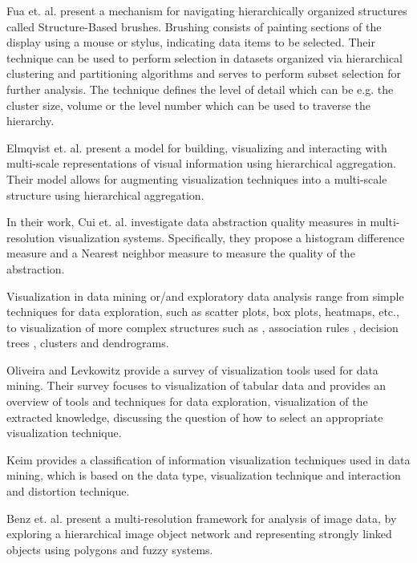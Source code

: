 Fua et. al. \cite{Fua:2000:SBM:614278.614457} present a mechanism for navigating hierarchically organized structures
called Structure-Based brushes. Brushing consists of painting sections of the display using a mouse or stylus, indicating
data items to be selected. Their technique can be used to perform selection in datasets organized via hierarchical
clustering and partitioning algorithms and serves to perform subset selection for further analysis. The technique defines
the level of detail which can be e.g. the cluster size, volume or the level number which can be used to traverse the
hierarchy.

Elmqvist et. al. \cite{Elmqvist:2010:HAI:1749404.1749525} present a model for building, visualizing and interacting with
multi-scale representations of visual information using hierarchical aggregation. Their model allows for augmenting visualization
techniques into a multi-scale structure using hierarchical aggregation.

In their work, Cui et. al. \cite{4015421} investigate data abstraction quality measures in multi-resolution
visualization systems. Specifically, they propose a histogram difference measure and a Nearest neighbor
measure to measure the quality of the abstraction.



Visualization in data mining or/and exploratory data analysis range from simple techniques for data exploration, such as
scatter plots, box plots, heatmaps, etc., to visualization of more complex structures such as ,
association rules \cite{Hahsler_visualizingassociation}, decision trees \cite{963292,Nguyen2000}, clusters and dendrograms.

Oliveira and Levkowitz \cite{1207445} provide a survey of visualization tools used for data mining. Their survey focuses
to visualization of tabular data and provides an overview of tools and techniques for data exploration,
visualization of the extracted knowledge, discussing the question of how to select an appropriate visualization
technique.

Keim \cite{981847} provides a classification of information visualization techniques used in data mining, which is based on
the data type, visualization technique and interaction and distortion technique.

Benz et. al. \cite{Benz2004239} present a multi-resolution framework for analysis of image data, by exploring a hierarchical
image object network and representing strongly linked objects using polygons and fuzzy systems.


